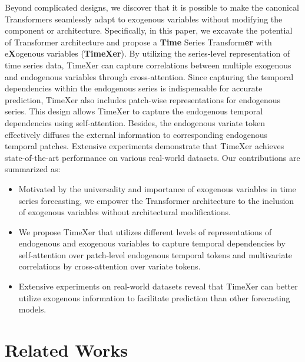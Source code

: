 \documentclass[nohyperref]{article}
\theoremstyle{plain}
\theoremstyle{definition}
\theoremstyle{remark}
\begin{document}
Beyond complicated designs, we discover that it is possible to make the canonical Transformers seamlessly adapt to exogenous variables without modifying the component or architecture. Specifically, in this paper, we excavate the potential of Transformer architecture and propose a \textbf{Time} Series Transform\textbf{er} with e\textbf{X}ogenous variables (\textbf{TimeXer}). By utilizing the series-level representation of time series data, TimeXer can capture correlations between multiple exogenous and endogenous variables through cross-attention. Since capturing the temporal dependencies within the endogenous series is indispensable for accurate prediction, TimeXer also includes patch-wise representations for endogenous series. This design allows TimeXer to capture the endogenous temporal dependencies using self-attention. Besides, the endogenous variate token effectively diffuses the external information to corresponding endogenous temporal patches. Extensive experiments demonstrate that TimeXer achieves state-of-the-art performance on various real-world datasets. Our contributions are summarized as:
\vspace{-5pt}
\begin{itemize}
    \item Motivated by the universality and importance of exogenous variables in time series forecasting, we empower the Transformer architecture to the inclusion of exogenous variables without architectural modifications.
    \item We propose TimeXer that utilizes different levels of representations of endogenous and exogenous variables to capture temporal dependencies by self-attention over patch-level endogenous temporal tokens and multivariate correlations by cross-attention over variate tokens.
    \item Extensive experiments on real-world datasets reveal that TimeXer can better utilize exogenous information to facilitate prediction than other forecasting models.
\end{itemize}


\section{Related Works}
\end{document}
